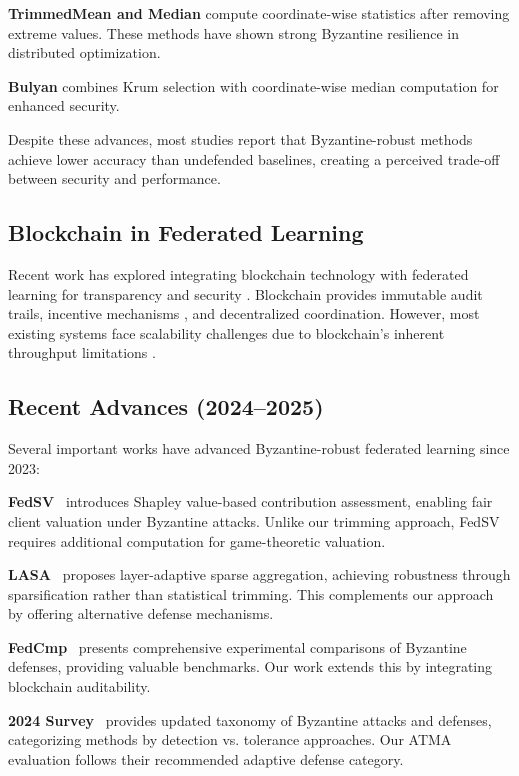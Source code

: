 \documentclass{ieeeaccess}
\begin{document}
\textbf{TrimmedMean and Median} \cite{yin2018byzantine} compute coordinate-wise statistics after removing extreme values. These methods have shown strong Byzantine resilience in distributed optimization.

\textbf{Bulyan} \cite{mhamdi2018hidden} combines Krum selection with coordinate-wise median computation for enhanced security.

Despite these advances, most studies report that Byzantine-robust methods achieve lower accuracy than undefended baselines, creating a perceived trade-off between security and performance.

\subsection{Blockchain in Federated Learning}

Recent work has explored integrating blockchain technology with federated learning for transparency and security \cite{kim2019blockchained,li2020blockchain,shayan2021biscotti,zhang2021blockchain}. Blockchain provides immutable audit trails, incentive mechanisms \cite{toyoda2020mechanism}, and decentralized coordination. However, most existing systems face scalability challenges due to blockchain's inherent throughput limitations \cite{wu2024blockchain}.

\subsection{Recent Advances (2024--2025)}

Several important works have advanced Byzantine-robust federated learning since 2023:

\textbf{FedSV}~\cite{xu2024fedsv} introduces Shapley value-based contribution assessment, enabling fair client valuation under Byzantine attacks. Unlike our trimming approach, FedSV requires additional computation for game-theoretic valuation.

\textbf{LASA}~\cite{wang2024lasa} proposes layer-adaptive sparse aggregation, achieving robustness through sparsification rather than statistical trimming. This complements our approach by offering alternative defense mechanisms.

\textbf{FedCmp}~\cite{li2024fedcmp} presents comprehensive experimental comparisons of Byzantine defenses, providing valuable benchmarks. Our work extends this by integrating blockchain auditability.

\textbf{2024 Survey}~\cite{rodriguez2024survey} provides updated taxonomy of Byzantine attacks and defenses, categorizing methods by detection vs. tolerance approaches. Our ATMA evaluation follows their recommended adaptive defense category.
\end{document}
